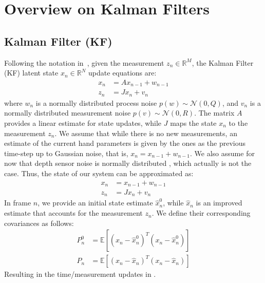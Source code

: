 \appendix

\section{Overview on Kalman Filters}

\subsection{Kalman Filter (KF)} 
\label{app:kalman}
Following the notation in~\cite{welch1995introduction}, given the measurement $z_n \in \mathbb{R}^M$, the Kalman Filter (KF) latent state $x_n \in \mathbb{R}^N$ update equations are:
% 
\begin{align}
x_n &= A x_{n - 1} +  w_{n - 1} \\
z_n &= J x_n + v_n
\end{align}
% 
where $w_n$ is a normally distributed process noise $p(w) \sim \mathcal{N}(0, Q)$, and $v_n$ is a normally distributed measurement noise $p(v) \sim \mathcal{N}(0, R)$. The matrix $A$ provides a linear estimate for state updates, while $J$ maps the state $x_n$ to the measurement $z_n$.
We assume that while there is no new measurements, an estimate of the current hand parameters is given by the ones as the previous time-step up to Gaussian noise, that is, $x_n = x_{n-1} + w_{n-1}$. We also assume for now that depth sensor noise is normally distributed , which actually is not the case. Thus, the state of our system can be approximated as:
% 
\begin{align}
x_n &= x_{n - 1} + w_{n - 1} \\
z_n &= J x_n + v_n
\end{align}
% 
In frame $n$, we provide an initial state estimate $\hat{x}_n^0$, while $\hat{x}_n$ is an improved estimate that accounts for the measurement $z_n$. We define their corresponding covariances as follows: 
% 
\begin{align}
P_n^0 &= \mathbb{E}[(x_n - \hat{x}_n^0)^T(x_n - \hat{x}_n^0)]\\
P_n   &= \mathbb{E}[(x_n - \hat{x}_n)^T(x_n - \hat{x}_n)]
\end{align}
%
Resulting in the time/measurement updates in .

